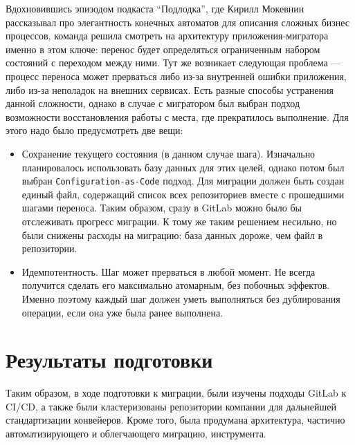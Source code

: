 Вдохновившись эпизодом\cite{podlodka-podcast} подкаста \enquote{Подлодка},
где Кирилл Мокевнин рассказывал про элегантность конечных автоматов\cite{fsm} для описания сложных бизнес процессов,
команда решила смотреть на архитектуру приложения-мигратора именно в этом ключе:
перенос будет определяться ограниченным набором состояний с переходом между ними.
Тут же возникает следующая проблема — процесс переноса может прерваться либо из-за внутренней ошибки приложения, либо из-за неполадок на внешних сервисах.
Есть разные способы устранения данной сложности, однако в случае с мигратором был выбран подход возможности восстановления работы с места, где прекратилось выполнение.
Для этого надо было предусмотреть две вещи:
\begin{itemize}
  \item Сохранение текущего состояния (в данном случае шага).
        Изначально планировалось использовать базу данных для этих целей, однако потом был выбран \texttt{Configuration-as-Code} подход\cite{cac}.
        Для миграции должен быть создан единый файл, содержащий список всех репозиториев вместе с прошедшими шагами переноса.
        Таким образом, сразу в GitLab можно было бы отслеживать прогресс миграции.
        К тому же таким решением несильно, но были снижены расходы на миграцию: база данных дороже, чем файл в репозитории.
  \item Идемпотентность\cite{idempotence}.
        Шаг может прерваться в любой момент.
        Не всегда получится сделать его максимально атомарным, без побочных эффектов.
        Именно поэтому каждый шаг должен уметь выполняться без дублирования операции, если она уже была ранее выполнена.
\end{itemize}

\section{Результаты подготовки} \label{sec:preparation-result}
Таким образом, в ходе подготовки к миграции, были изучены подходы GitLab к CI/CD,
а также были кластеризованы репозитории компании для дальнейшей стандартизации конвейеров.
Кроме того, была продумана архитектура, частично автоматизирующего и облегчающего миграцию, инструмента.
